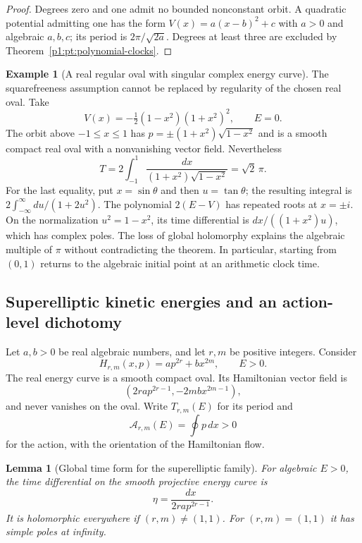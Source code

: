 \documentclass[11pt,a4paper]{article}
\newtheorem{lemma}[theorem]{Lemma}
\theoremstyle{definition}
\newtheorem{example}[theorem]{Example}
\theoremstyle{remark}
\numberwithin{equation}{section}
\begin{document}
\begin{proof}
Degrees zero and one admit no bounded nonconstant orbit.
A quadratic potential admitting one has the form
$V(x)=a(x-b)^2+c$ with $a>0$ and algebraic $a,b,c$; its period is
$2\pi/\sqrt{2a}$.  Degrees at least three are excluded by
Theorem~\ref{p1:pt:polynomial-clocks}.
\end{proof}

\begin{example}[A real regular oval with singular complex energy curve]
\label{p1:pt:singular-counterexample}
The squarefreeness assumption cannot be replaced by regularity of the
chosen real oval.  Take
\[
 V(x)=-\tfrac12(1-x^2)(1+x^2)^2,\qquad E=0.
\]
The orbit above $-1\le x\le1$ has
$p=\pm(1+x^2)\sqrt{1-x^2}$ and is a smooth compact real oval with a
nonvanishing vector field.  Nevertheless
\[
 T=2\int_{-1}^{1}\frac{dx}{(1+x^2)\sqrt{1-x^2}}
   =\sqrt2\,\pi.
\]
For the last equality, put $x=\sin\theta$ and then
$u=\tan\theta$; the resulting integral is
$2\int_{-\infty}^{\infty}du/(1+2u^2)$.
The polynomial $2(E-V)$ has repeated roots at $x=\pm i$.
On the normalization $u^2=1-x^2$, its time differential is
$dx/((1+x^2)u)$, which has complex poles.  The loss of global
holomorphy explains the algebraic multiple of $\pi$ without
contradicting the theorem.  In particular, starting from $(0,1)$
returns to the algebraic initial point at an arithmetic clock time.
\end{example}

\subsection{Superelliptic kinetic energies and an action-level dichotomy}

Let $a,b>0$ be real algebraic numbers, and let $r,m$ be positive integers.
Consider
\begin{equation}\label{p1:pt:power-H}
 H_{r,m}(x,p)=a p^{2r}+b x^{2m},\qquad E>0.
\end{equation}
The real energy curve is a smooth compact oval.  Its Hamiltonian vector
field is
\[
 (2ra p^{2r-1},-2mb x^{2m-1}),
\]
and never vanishes on the oval.
Write $T_{r,m}(E)$ for its period and
\[
 \mathcal A_{r,m}(E)=\oint p\,dx>0
\]
for the action, with the orientation of the Hamiltonian flow.

\begin{lemma}[Global time form for the superelliptic family]
\label{p1:pt:superelliptic-time}
For algebraic $E>0$, the time differential on the smooth projective
energy curve is
\[
 \eta=\frac{dx}{2ra p^{2r-1}}.
\]
It is holomorphic everywhere if $(r,m)\ne(1,1)$.
For $(r,m)=(1,1)$ it has simple poles at infinity.
\end{lemma}
\end{document}
